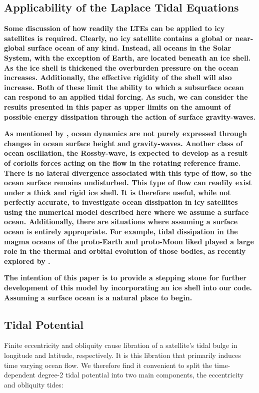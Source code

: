 \subsection{\textbf{Applicability of the Laplace Tidal Equations} \label{subsec:applicability}}

\textbf{Some discussion of how readily the LTEs can be applied to icy satellites is required. Clearly, no icy satellite contains a global or near-global surface ocean of any kind. Instead, all oceans in the Solar System, with the exception of Earth, are located beneath an ice shell. As the ice shell is thickened the overburden pressure on the ocean increases. Additionally, the effective rigidity of the shell will also increase. Both of these limit the ability to which a subsurface ocean can respond to an applied tidal forcing. As such, we can consider the results presented in this paper as upper limits on the amount of possible energy dissipation through the action of surface gravity-waves.}   

\textbf{As mentioned by \citet{tyler2008strong}, ocean dynamics are not purely expressed through changes in ocean surface height and gravity-waves. Another class of ocean oscillation, the Rossby-wave, is expected to develop as a result of coriolis forces acting on the flow in the rotating reference frame. There is no lateral divergence associated with this type of flow, so  the ocean surface remains undisturbed. This type of flow can readily exist under a thick and rigid ice shell. It is therefore useful, while not perfectly accurate, to investigate ocean dissipation in icy satellites using the numerical model described here where we assume a surface ocean. Additionally, there are situations where assuming a surface ocean is entirely appropriate. For example, tidal dissipation in the magma oceans of the proto-Earth and proto-Moon liked played a large role in the thermal and orbital evolution of those bodies, as recently explored by \citet{chen2016tidal}.}

\textbf{The intention of this paper is to provide a stepping stone for further development of this model by incorporating an ice shell into our code. Assuming a surface ocean is a natural place to begin.}


\subsection{Tidal Potential \label{subsec:pot}}

Finite eccentricity and obliquity cause libration of a satellite's tidal bulge in longitude and latitude, respectively. It is this libration that primarily induces time varying ocean flow. We therefore find it convenient to split the time-dependent degree-2 tidal potential into two main components, the eccentricity and obliquity tides:

